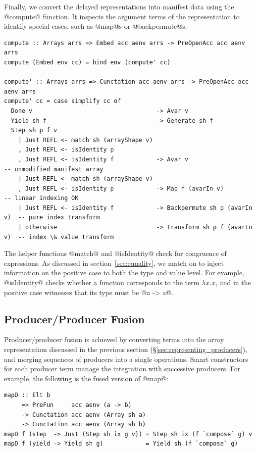 Finally, we convert the delayed representations into manifest data using the
@compute@ function. It inspects the argument terms of the representation to
identify special cases, such as @map@s or @backpermute@s.
%
\begin{lstlisting}[style=haskell
    ,label=lst:compute
    ,caption={Computing the delayed representation to a manifest array}]
compute :: Arrays arrs => Embed acc aenv arrs -> PreOpenAcc acc aenv arrs
compute (Embed env cc) = bind env (compute' cc)

compute' :: Arrays arrs => Cunctation acc aenv arrs -> PreOpenAcc acc aenv arrs
compute' cc = case simplify cc of
  Done v                                   -> Avar v
  Yield sh f                               -> Generate sh f
  Step sh p f v
    | Just REFL <- match sh (arrayShape v)
    , Just REFL <- isIdentity p
    , Just REFL <- isIdentity f            -> Avar v                       -- unmodified manifest array
    | Just REFL <- match sh (arrayShape v)
    , Just REFL <- isIdentity p            -> Map f (avarIn v)             -- linear indexing OK
    | Just REFL <- isIdentity f            -> Backpermute sh p (avarIn v)  -- pure index transform
    | otherwise                            -> Transform sh p f (avarIn v)  -- index \& value transform
\end{lstlisting}

The helper functions @match@ and @isIdentity@ check for congruence of
expressions. As discussed in section~\ref{sec:equality}, we match on  to inject information on the positive case to both the type and value
level. For example, @isIdentity@ checks whether a function corresponds to
the term $\lambda x.x$, and in the positive case witnesses that its type must be
@a -> a@.


\subsection{Producer/Producer Fusion}
\label{sec:producer_producer_fusion}

Producer/producer fusion is achieved by converting terms into the array
representation discussed in the previous section
(\S\ref{sec:representing_producers}), and merging sequences of producers into a
single operations. Smart constructors for each producer term manage the
integration with successive producers. For example, the following is the fused
version of @map@:
%
\begin{lstlisting}[style=haskell,
    caption={Fused definition of the @map@ operation},
    label=lst:mapD]
mapD :: Elt b
     => PreFun     acc aenv (a -> b)
     -> Cunctation acc aenv (Array sh a)
     -> Cunctation acc aenv (Array sh b)
mapD f (step  -> Just (Step sh ix g v)) = Step sh ix (f `compose` g) v
mapD f (yield -> Yield sh g)            = Yield sh (f `compose` g)
\end{lstlisting}

